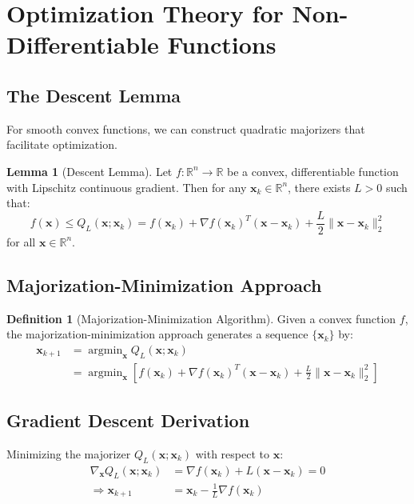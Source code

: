 \documentclass[12pt]{article}
\renewcommand{\vec}[1]{\mathbf{#1}}
\DeclareMathOperator{\argmin}{argmin}
\newcommand{\norm}[1]{\lVert#1\rVert}
\newcommand{\R}{\mathbb{R}}
\theoremstyle{definition}
\newtheorem{lemma}[theorem]{Lemma}
\newtheorem{definition}[theorem]{Definition}
\begin{document}
\newpage

\section{Optimization Theory for Non-Differentiable Functions}

\subsection{The Descent Lemma}

For smooth convex functions, we can construct quadratic majorizers that facilitate optimization.

\begin{lemma}[Descent Lemma]
    Let $f: \R^n \to \R$ be a convex, differentiable function with Lipschitz continuous gradient. Then for any $\vec{x}_k \in \R^n$, there exists $L > 0$ such that:
    \begin{equation}
        f(\vec{x}) \leq Q_L(\vec{x}; \vec{x}_k) = f(\vec{x}_k) + \nabla f(\vec{x}_k)^T(\vec{x} - \vec{x}_k) + \frac{L}{2}\norm{\vec{x} - \vec{x}_k}_2^2
    \end{equation}
    for all $\vec{x} \in \R^n$.
\end{lemma}

\subsection{Majorization-Minimization Approach}

\begin{definition}[Majorization-Minimization Algorithm]
    Given a convex function $f$, the majorization-minimization approach generates a sequence $\{\vec{x}_k\}$ by:
    \begin{align}
        \vec{x}_{k+1} & = \argmin_{\vec{x}} Q_L(\vec{x}; \vec{x}_k)                                                                                            \\
                      & = \argmin_{\vec{x}} \left[f(\vec{x}_k) + \nabla f(\vec{x}_k)^T(\vec{x} - \vec{x}_k) + \frac{L}{2}\norm{\vec{x} - \vec{x}_k}_2^2\right]
    \end{align}
\end{definition}

\subsection{Gradient Descent Derivation}

Minimizing the majorizer $Q_L(\vec{x}; \vec{x}_k)$ with respect to $\vec{x}$:
\begin{align}
    \nabla_{\vec{x}} Q_L(\vec{x}; \vec{x}_k) & = \nabla f(\vec{x}_k) + L(\vec{x} - \vec{x}_k) = 0 \\
    \Rightarrow \vec{x}_{k+1}                & = \vec{x}_k - \frac{1}{L}\nabla f(\vec{x}_k)
\end{align}
\end{document}
